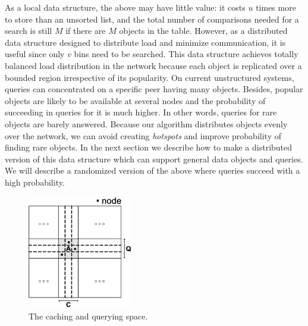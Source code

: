 \documentclass[conference]{IEEEtran}
\begin{document}
As a local data structure, the above may have little value: it costs $u$ times
more to store than an unsorted list, and the total number of comparisons
needed for a search is still $M$ if there are $M$ objects in the table.
However, as a distributed data structure designed to distribute load and
minimize communication, it is useful since only $v$ bins need to be searched.
This data structure achieves totally balanced load distribution 
in the network because each object is replicated over a bounded region 
irrespective of its popularity. On current unstructured systems, queries 
can concentrated on a specific peer having many objects. Besides, popular objects 
are likely to be available at several nodes and the probability of succeeding in
queries for it is much higher. In other words, queries for rare
objects are barely 
answered. Because our algorithm distributes objects 
evenly over the network, we can avoid creating \emph{hotspots} and improve 
probability of finding rare objects.
In the next section we describe how to
make a distributed version of this data structure which can support general
data objects and queries.  We will describe a randomized version of the above
where queries succeed with a high probability.
\begin{figure}
\centering
\includegraphics[width=1.8in]{space}
\caption{The caching and querying space.} \label{fig:space}
\end{figure}
\label{sec:table}
\end{document}
